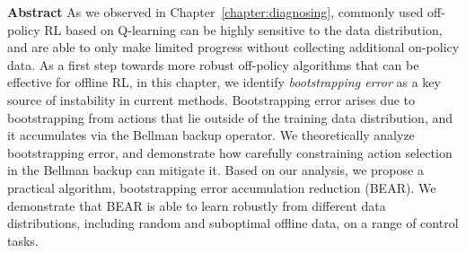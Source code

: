 \documentclass[../thesis.tex]{subfiles}
\begin{document}

\vspace{-0.4cm}
\begin{AIbox}{\large{\textbf{Abstract}}}
\vspace{4mm}
As we observed in Chapter~\ref{chapter:diagnosing}, commonly used off-policy RL based on Q-learning can be highly sensitive to the data distribution, and are able to only make limited progress without collecting additional on-policy data. As a first step towards more robust off-policy algorithms that can be effective for offline RL, in this chapter, we identify \emph{bootstrapping error} as a key source of instability in current methods. Bootstrapping error arises due to bootstrapping from actions that lie outside of the training data distribution, and it accumulates via the Bellman backup operator. We theoretically analyze bootstrapping error, and demonstrate how carefully constraining action selection in the Bellman backup can mitigate it. Based on our analysis, we propose a practical algorithm, bootstrapping error accumulation reduction (BEAR). We demonstrate that BEAR is able to learn robustly from different data distributions, including random and suboptimal offline data, on a range of control tasks.

\end{AIbox}
\end{document}

